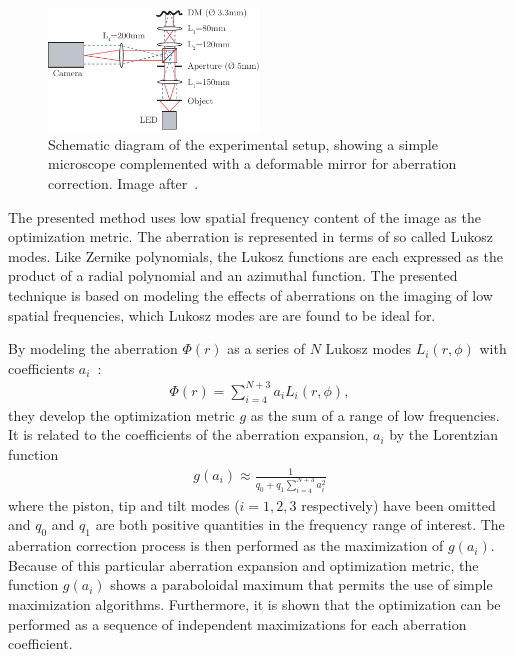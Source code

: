 \begin{figure}[htb]
	\centering
		\includegraphics[width=0.50\textwidth]{images/widefield_simple_microscope.pdf}
	\caption{Schematic diagram of the experimental setup, showing a simple microscope complemented with a deformable mirror for aberration correction. Image after~\cite{wide_AOM_loew_freq}.}
	\label{fig:widefield_simple_microscope}
\end{figure}

The presented method uses low spatial frequency content of the image as the optimization metric. The aberration is represented in terms of so called Lukosz modes. Like Zernike polynomials, the Lukosz functions are each expressed as the product of a radial polynomial and an azimuthal function. The presented technique is based on modeling the effects of aberrations on the imaging of low spatial frequencies, which Lukosz modes are are found to be ideal for.

\noindent By modeling the aberration $\Phi(r)$ as a series of $N$ Lukosz modes $L_i(r,\phi)$ with coefficients $a_i$~\cite{wide_Lukosz_Modes}:
\begin{align}
	\Phi(r) = \sum_{i=4}^{N+3}{a_i L_i(r,\phi)},
	\label{eq:aberration_expansion_Lukosz}
\end{align}
they develop the optimization metric $g$ as the sum of a range of low frequencies. It is related to the coefficients of the aberration expansion, $a_i$ by the Lorentzian function~\cite{wide_AOM_loew_freq}
\begin{align}
	g(a_i) \approx \frac{1}{q_0 + q_1 \sum_{i=4}^{N+3}{a_i^2}}
	\label{eq:aberration_metric}
\end{align}
where the piston, tip and tilt modes ($i = 1,2,3$ respectively) have been omitted and $q_0$ and $q_1$ are both positive quantities in the frequency range of interest. The aberration correction process is then performed as the maximization of $g(a_i)$. Because of this particular aberration expansion and  optimization metric, the function $g(a_i)$ shows a paraboloidal maximum that permits the use of simple maximization algorithms. Furthermore, it is shown that the optimization can be performed as a sequence of independent maximizations for each aberration coefficient. 

